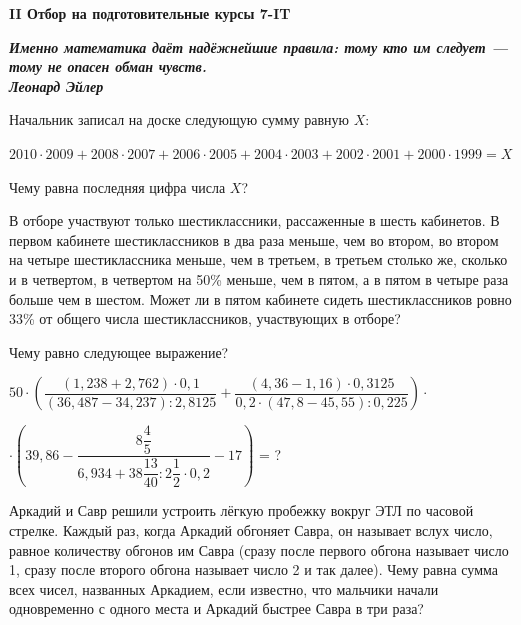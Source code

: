 \centerline{\bf \Huge II Отбор на подготовительные курсы 7-IT}

\begin{flushright}
        \scriptsize{\textbf{\textit{Именно математика даёт надёжнейшие правила: тому кто им следует — тому не опасен обман чувств. \\Леонард Эйлер}}}
        
\end{flushright}

 Начальник записал на доске следующую сумму равную $X$: 

$2010\cdot2009 + 2008\cdot2007 + 2006\cdot2005 + 2004\cdot2003 + 2002\cdot2001 + 2000\cdot1999= X$

Чему равна последняя цифра числа $X$?

\hspace{3mm}

 В отборе участвуют только шестиклассники, рассаженные в шесть кабинетов. В первом кабинете шестиклассников в два раза меньше, чем во втором, во втором на четыре шестиклассника меньше, чем в третьем, в третьем столько же, сколько и в четвертом, в четвертом на 50\% меньше, чем в пятом, а в пятом в четыре раза больше чем в шестом. Может ли в пятом кабинете сидеть шестиклассников ровно 33\% от общего числа шестиклассников, участвующих в отборе?

\hspace{3mm}

 Чему равно следующее выражение?

$50\cdot\left(\dfrac{(1,238+2,762) \cdot 0,1}{(36,487-34,237): 2,8125}+\dfrac{(4,36-1,16) \cdot 0,3125}{0,2 \cdot(47,8-45,55): 0,225}\right)\cdot$ 

$\cdot\left(39,86-\dfrac{8 \dfrac{4}{5}}{6,934+38 \dfrac{13}{40}: 2 \dfrac{1}{2} \cdot 0,2}-17\right)$ = ?

\hspace{3mm}

 Аркадий и Савр решили устроить лёгкую пробежку вокруг ЭТЛ по часовой стрелке. Каждый раз, когда Аркадий обгоняет Савра, он называет вслух число, равное количеству обгонов им Савра (сразу после первого обгона называет число 1, сразу после второго обгона называет число 2 и так далее). Чему равна сумма всех чисел, названных Аркадием, если известно, что мальчики начали одновременно с одного места и Аркадий быстрее Савра в три раза?

\hspace{3mm}


